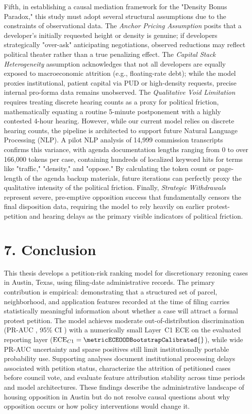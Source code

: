 Fifth, in establishing a causal mediation framework for the "Density Bonus Paradox," this study must adopt several structural assumptions due to the constraints of observational data. The \textit{Anchor Pricing Assumption} posits that a developer's initially requested height or density is genuine; if developers strategically "over-ask" anticipating negotiations, observed reductions may reflect political theater rather than a true penalizing effect. The \textit{Capital Stack Heterogeneity} assumption acknowledges that not all developers are equally exposed to macroeconomic attrition (e.g., floating-rate debt); while the model proxies institutional, patient capital via PUD or high-density requests, precise internal pro-forma data remains unobserved. The \textit{Qualitative Void Limitation} requires treating discrete hearing counts as a proxy for political friction, mathematically equating a routine 5-minute postponement with a highly contested 4-hour hearing. However, while our current model relies on discrete hearing counts, the pipeline is architected to support future Natural Language Processing (NLP). A pilot NLP analysis of 14,999 commission transcripts confirms this variance, with agenda documentation lengths ranging from 0 to over 166,000 tokens per case, containing hundreds of localized keyword hits for terms like "traffic," "density," and "oppose." By calculating the token count or page-length of the agenda backup materials, future iterations can perfectly proxy the qualitative intensity of the political friction. Finally, \textit{Strategic Withdrawals} represent severe, pre-emptive opposition success that fundamentally censors the final disposition data, requiring the model to rely heavily on earlier protest-petition and hearing delays as the primary visible indicators of political friction.

\section*{7. Conclusion}
This thesis develops a petition-risk ranking model for discretionary rezoning cases in Austin, Texas, using filing-date administrative records. The primary contribution is empirical: demonstrating that a structured set of parcel, neighborhood, and application features recorded at the time of filing carries statistically meaningful information about whether a case will attract a formal protest petition. The model achieves moderate out-of-distribution discrimination (PR-AUC \metricBootstrapFiling{}, 95\% CI \metricBootstrapFilingCI{}) with a numerically small Layer~C1 ECE on the evaluated reporting layer ($\text{ECE}_{C1}=\metricECEOODBootstrapCalibrated{}$), while wide PR-AUC uncertainty and sparse positives still limit institutionally portable probability use. Supporting analyses document institutional processing delays associated with petition status, characterize the attrition of petitioned cases before council vote, and evaluate feature attribution stability across time periods and model architectures. These findings describe the administrative landscape of housing opposition in Austin but do not resolve causal questions about why opposition occurs or how policy interventions would change it.
